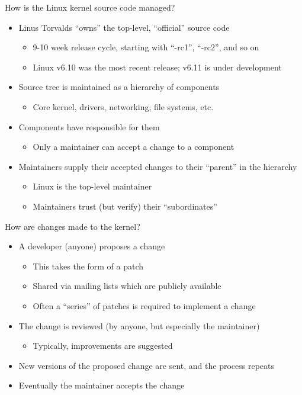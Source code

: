 \documentclass[aspectratio=169, notes]{beamer}
\begin{document}
\begin{frame}{How is the Linux kernel source code managed?}
	\begin{itemize}
	\item Linus Torvalds ``owns'' the top-level, ``official'' source code
		\begin{itemize}
		\item 9-10 week release cycle, starting with ``-rc1'', ``-rc2'', and so on
		\item Linux v6.10 was the most recent release; v6.11 is under development
		\end{itemize}
	\item Source tree is maintained as a hierarchy of components
		\begin{itemize}
		\item Core kernel, drivers, networking, file systems, etc.
		\end{itemize}
	\item Components have  responsible for them
		\begin{itemize}
		\item Only a maintainer can accept a change to a component
		\end{itemize}
	\item Maintainers supply their accepted changes to their ``parent'' in the hierarchy
		\begin{itemize}
		\item Linux is the top-level maintainer
		\item Maintainers trust (but verify) their ``subordinates''
		\end{itemize}
	\end{itemize}
\end{frame}

\begin{frame}{How are changes made to the kernel?}
	\begin{itemize}
	\item A developer (anyone) proposes a change
		\begin{itemize}
		\item This takes the form of a patch
		\item Shared via  mailing lists which are publicly available
		\item Often a ``series'' of patches is required to implement a change
		\end{itemize}
	\item The change is reviewed (by anyone, but especially the maintainer)
		\begin{itemize}
		\item Typically, improvements are suggested
		\end{itemize}
	\item New versions of the proposed change are sent, and the process repeats
	\item Eventually the maintainer accepts the change
	\end{itemize}
\end{frame}
\end{document}
